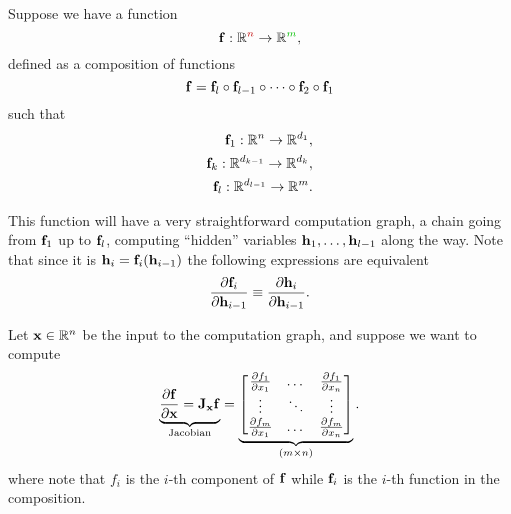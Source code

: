 

Suppose we have a function
\begin{equation}
    \vb{f} : \mathbb{R}^{\color{red}n} \to \mathbb{R}^{\color{darkgreen} m},
\end{equation}
defined as a composition of functions 
\begin{equation}
    \vb{f} = \vb{f}_l \circ \vb{f}_{l-1} \circ \dots \circ \vb{f}_2 \circ \vb{f}_1
\end{equation}
such that 
\begin{equation}
    \begin{aligned}
        \vb{f}_1: \mathbb{R}^n \to \mathbb{R}^{d_1}, \\
        \vb{f}_k: \mathbb{R}^{d_{k-1}} \to \mathbb{R}^{d_k}, \\
        \vb{f}_l: \mathbb{R}^{d_{l-1}} \to \mathbb{R}^{m}.
    \end{aligned}    
\end{equation}

This function will have a very straightforward computation graph, a chain going from $\vb{f}_1$ up to $\vb{f}_l$, computing ``hidden'' variables $\vb{h}_1, \dots, \vb{h}_{l-1}$ along the way. 
Note that since it is $\vb{h}_{i} = \vb{f}_i(\vb{h}_{i-1})$ the following expressions are equivalent
\begin{equation}
    \pdv{\vb{f}_i}{\vb{h}_{i-1}} \equiv \pdv{\vb{h}_{i}}{\vb{h}_{i-1}}.
\end{equation}

Let $\vb{x} \in \mathbb{R}^n$ be the input to the computation graph, and suppose we want to compute 
\begin{equation}
    \underbrace{\pdv{\vb{f}}{\vb{x}} = \mathbf{J}_{\vb{x}} \vb{f}}_{\text{Jacobian}} = \underbrace{\mqty[
        \pdv{f_1}{x_1} & \dots & \pdv{f_1}{x_n} \\
        \vdots & \ddots & \vdots \\
        \pdv{f_m}{x_1} & \dots & \pdv{f_m}{x_n}
    ]}_{(m \times n)}.
    \label{eq:07:3:4:jacobian}
\end{equation}
where note that $f_i$ is the $i$-th component of $\vb{f}$ while $\vb{f}_i$ is the $i$-th function in the composition.

